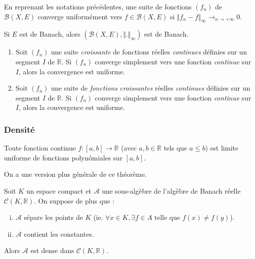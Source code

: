 	\begin{proposition}
		En reprenant les notations précédentes, une suite de fonctions $(f_n)$ de $\mathcal{B}(X,E)$ converge uniformément vers $f \in \mathcal{B}(X,E)$ si $\Vert f_n - f \Vert_\infty \longrightarrow_{n \rightarrow +\infty} 0$.
	\end{proposition}

	\begin{proposition}
		Si $E$ est de Banach, alors $(\mathcal{B}(X,E), \Vert . \Vert_\infty)$ est de Banach.
	\end{proposition}


	\begin{theorem}
		\begin{enumerate}
			\item Soit $(f_n)$ une suite \textit{croissante} de fonctions réelles \textit{continues} définies sur un segment $I$ de $\mathbb{R}$. Si $(f_n)$ converge simplement vers une fonction \textit{continue} sur $I$, alors la convergence est uniforme.
			\item Soit $(f_n)$ une suite de \textit{fonctions croissantes} réelles \textit{continues} définies sur un segment $I$ de $\mathbb{R}$. Si $(f_n)$ converge simplement vers une fonction \textit{continue} sur $I$, alors la convergence est uniforme.
		\end{enumerate}
	\end{theorem}

	\subsubsection{Densité}


	\begin{theorem}[Weierstrass]
		Toute fonction continue $f : [a,b] \rightarrow \mathbb{R}$ (avec $a, b \in \mathbb{R}$ tels que $a \leq b$) est limite uniforme de fonctions polynômiales sur $[a, b]$.
	\end{theorem}

	On a une version plus générale de ce théorème.


	\begin{theorem}
		Soit $K$ un espace compact et $\mathcal{A}$ une sous-algèbre de l'algèbre de Banach réelle $\mathcal{C}(K, \mathbb{R})$. On suppose de plus que :
		\begin{enumerate}[(i)]
			\item $\mathcal{A}$ sépare les points de $K$ (ie. $\forall x \in K, \exists f \in A \text{ telle que } f(x) \neq f(y)$).
			\item $\mathcal{A}$ contient les constantes.
		\end{enumerate}
		Alors $\mathcal{A}$ est dense dans $\mathcal{C}(K, \mathbb{R})$.
	\end{theorem}

